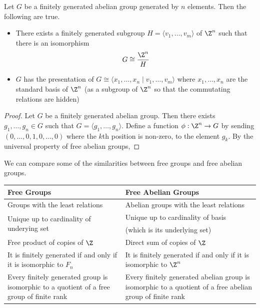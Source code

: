 \documentclass[a4paper]{article}
\begin{document}
\begin{prp}{}{} Let $G$ be a finitely generated abelian group generated by $n$ elements. Then the following are true. 
\begin{itemize}
\item There exists a finitely generated subgroup $H=\langle v_1,\dots,v_m\rangle$ of $\Z^n$ such that there is an isomorphism $$G\cong\frac{\Z^n}{H}$$
\item $G$ has the presentation of $G\cong\langle x_1,\dots,x_n\;|\;v_1,\dots,v_m\rangle$ where $x_1,\dots,x_n$ are the standard basis of $\Z^n$ (as a subgroup of $\Z^n$ so that the commutating relations are hidden)
\end{itemize} 
\begin{proof}
Let $G$ be a finitely generated abelian group. Then there exists $g_1,\dots,g_n\in G$ such that $G=\langle g_1,\dots,g_n\rangle$. Define a function $\phi:\Z^n\to G$ by sending $(0,\dots,0,1,0,\dots,0)$ where the $k$th position is non-zero, to the element $g_k$. By the universal property of free abelian groups, 
\end{proof}
\end{prp}

We can compare some of the similarities between free groups and free abelian groups. 

\begin{table}[!ht]
\centering
\begin{tabular}{p{8cm}|p{8cm}}
Free Groups                                                                               & Free Abelian Groups                                                                                       \\[1.5ex] \hline\hline
Groups with the least relations                                                           & Abelian groups with the least relations                                                                   \\[1.5ex]\hline
\multirow{2}{*}{Unique up to cardinality of underying set}                                & Unique up to cardinality of basis                                                                         \\
                                                                                          & (which is its underlying set)                                                                             \\\hline
Free product of copies of $\Z$                                                         & Direct sum of copies of $\Z$                                                                              \\[1.5ex]\hline
It is finitely generated if and only if it is isomorphic to $F_n$                         & It is finitely generated if and only if it is isomorphic to $\Z^n$                                        \\[1.5ex]\hline
Every finitely generated group is isomorphic to a quotient of a free group of finite rank & Every finitely generated abelian group is isomorphic to a quotient of a free abelian group of finite rank
\end{tabular}
\end{table}
\end{document}
